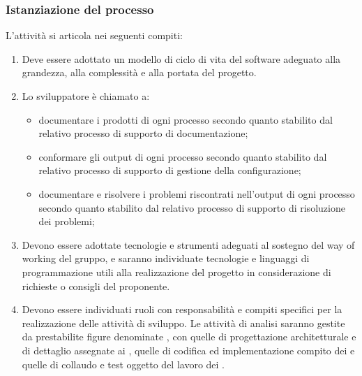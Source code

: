\subsubsection{Istanziazione del processo}
L'attività si articola nei seguenti compiti:
\begin{enumerate}
    \item Deve essere adottato un modello di ciclo di vita del software adeguato alla grandezza, alla complessità e alla portata del progetto.
    \item Lo sviluppatore è chiamato a:
    \begin{itemize}
        \item documentare i prodotti di ogni processo secondo quanto stabilito dal relativo processo di supporto di documentazione;
        \item conformare gli output di ogni processo secondo quanto stabilito dal relativo processo di supporto di gestione della configurazione;
        \item documentare e risolvere i problemi riscontrati nell'output di ogni processo secondo quanto stabilito dal relativo processo di supporto di risoluzione dei problemi;
    \end{itemize}
    \item Devono essere adottate tecnologie e strumenti adeguati al sostegno del way of working del gruppo, e saranno individuate tecnologie e linguaggi di programmazione utili alla realizzazione del progetto in considerazione di richieste o consigli del proponente.
    \item Devono essere individuati ruoli con responsabilità e compiti specifici per la realizzazione delle attività di sviluppo. Le attività di analisi saranno gestite da prestabilite figure denominate , con quelle di progettazione architetturale e di dettaglio assegnate ai , quelle di codifica ed implementazione compito dei  e quelle di collaudo e test oggetto del lavoro dei .
\end{enumerate}

